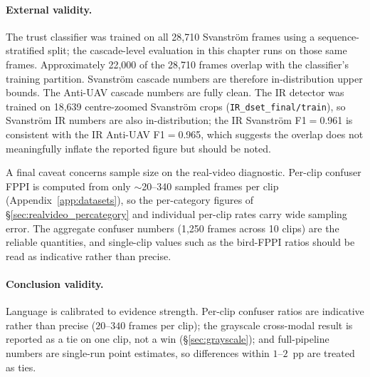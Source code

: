 \paragraph{External validity.}
The trust classifier was trained on all 28,710 Svanstr\"om frames using a sequence-stratified split; the cascade-level evaluation in this chapter runs on those same frames. Approximately 22,000 of the 28,710 frames overlap with the classifier's training partition. Svanstr\"om cascade numbers are therefore in-distribution upper bounds. The Anti-UAV cascade numbers are fully clean. The IR detector was trained on 18,639 centre-zoomed Svanstr\"om crops (\texttt{IR\_dset\_final/train}), so Svanstr\"om IR numbers are also in-distribution; the IR Svanstr\"om F1$=$0.961 is consistent with the IR Anti-UAV F1$=$0.965, which suggests the overlap does not meaningfully inflate the reported figure but should be noted.

A final caveat concerns sample size on the real-video diagnostic. Per-clip confuser FPPI is computed from only $\sim$20--340 sampled frames per clip (Appendix~\ref{app:datasets}), so the per-category figures of \S\ref{sec:realvideo_percategory} and individual per-clip rates carry wide sampling error. The aggregate confuser numbers (1{,}250 frames across 10 clips) are the reliable quantities, and single-clip values such as the bird-FPPI ratios should be read as indicative rather than precise.

\paragraph{Conclusion validity.}
Language is calibrated to evidence strength. Per-clip confuser ratios are indicative rather than precise ($20$--$340$ frames per clip); the grayscale cross-modal result is reported as a tie on one clip, not a win (\S\ref{sec:grayscale}); and full-pipeline numbers are single-run point estimates, so differences within $1$--$2$~pp are treated as ties.

